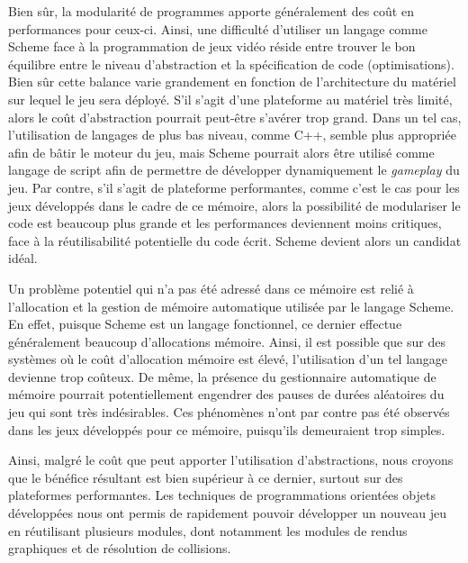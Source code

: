 \documentclass[12pt,oneside,letterpaper,francais]{book}
\begin{document}
Bien sûr, la modularité de programmes apporte généralement des coût en
performances pour ceux-ci. Ainsi, une difficulté d'utiliser un langage
comme Scheme face à la programmation de jeux vidéo réside entre
trouver le bon équilibre entre le niveau d'abstraction et la
spécification de code (optimisations). Bien sûr cette balance varie
grandement en fonction de l'architecture du matériel sur lequel le jeu
sera déployé. S'il s'agit d'une plateforme au matériel très limité,
alors le coût d'abstraction pourrait peut-être s'avérer trop
grand. Dans un tel cas, l'utilisation de langages de plus bas niveau,
comme C++, semble plus appropriée afin de bâtir le moteur du jeu, mais
Scheme pourrait alors être utilisé comme langage de script afin de
permettre de développer dynamiquement le \textit{gameplay} du jeu. Par
contre, s'il s'agit de plateforme performantes, comme c'est le cas
pour les jeux développés dans le cadre de ce mémoire, alors la
possibilité de modulariser le code est beaucoup plus grande et les
performances deviennent moins critiques, face à la réutilisabilité
potentielle du code écrit. Scheme devient alors un candidat idéal.

Un problème potentiel qui n'a pas été adressé dans ce mémoire est
relié à l'allocation et la gestion de mémoire automatique utilisée par
le langage Scheme. En effet, puisque Scheme est un langage
fonctionnel, ce dernier effectue généralement beaucoup d'allocations
mémoire. Ainsi, il est possible que sur des systèmes où le coût
d'allocation mémoire est élevé, l'utilisation d'un tel langage
devienne trop coûteux. De même, la présence du gestionnaire
automatique de mémoire pourrait potentiellement engendrer des pauses
de durées aléatoires du jeu qui sont très indésirables. Ces phénomènes
n'ont par contre pas été observés dans les jeux développés pour ce
mémoire, puisqu'ils demeuraient trop simples.

Ainsi, malgré le coût que peut apporter l'utilisation d'abstractions,
nous croyons que le bénéfice résultant est bien supérieur à ce
dernier, surtout sur des plateformes performantes. Les techniques de
programmations orientées objets développées nous ont permis de
rapidement pouvoir développer un nouveau jeu en réutilisant plusieurs
modules, dont notamment les modules de rendus graphiques et de
résolution de collisions.





\end{document}
